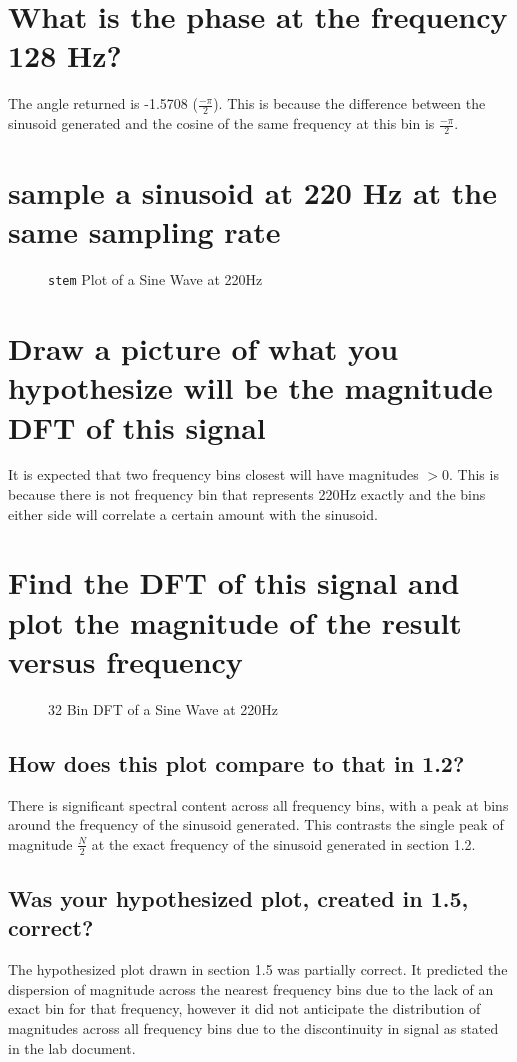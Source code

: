 \documentclass[titlepage]{scrartcl}
\newcommand{\code}[1]{\texttt{#1}}
\begin{document}
\section{What is the phase at the frequency 128 Hz?}
The angle returned is -1.5708 ($\frac{-\pi}{2}$). This is because the
difference between the sinusoid generated and the cosine of the same frequency
at this bin is $\frac{-\pi}{2}$.

\section{sample a sinusoid at 220 Hz at the same sampling rate}
\begin{figure}[H]
    \caption{\code{stem} Plot of a Sine Wave at 220Hz}
\end{figure}

\section{Draw a picture of what you hypothesize will be the magnitude DFT of
this signal}
It is expected that two frequency bins closest will have magnitudes $> 0$. This
is because there is not frequency bin that represents 220Hz exactly and the
bins either side will correlate a certain amount with the sinusoid.

\section{Find the DFT of this signal and plot the magnitude of the result versus frequency}
\begin{figure}[H]
    \caption{32 Bin DFT of a Sine Wave at 220Hz}
\end{figure}

\subsection{How does this plot compare to that in 1.2?}
There is significant spectral content across all frequency bins, with a peak
at bins around the frequency of the sinusoid generated. This contrasts the
single peak of magnitude $\frac{N}{2}$ at the exact frequency of the sinusoid
generated in section 1.2.
\subsection{Was your hypothesized plot, created in 1.5, correct?}
The hypothesized plot drawn in section 1.5 was partially correct. It predicted
the dispersion of magnitude across the nearest frequency bins due to the lack
of an exact bin for that frequency, however it did not anticipate the
distribution of magnitudes across all frequency bins due to the discontinuity
in signal as stated in the lab document.
\end{document}
